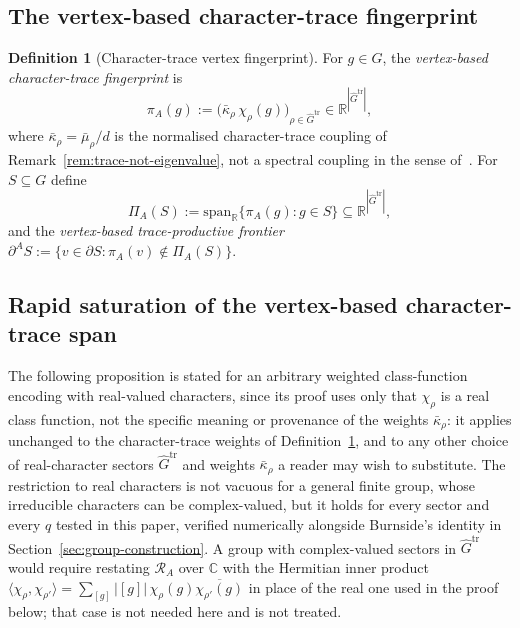 \documentclass[11pt,a4paper]{article}
\theoremstyle{plain}
\theoremstyle{definition}
\newtheorem{definition}[theorem]{Definition}
\theoremstyle{remark}
\newcommand{\R}{\mathbb{R}}
\newcommand{\C}{\mathbb{C}}
\newcommand{\adm}{\mathrm{tr}}
\newcommand{\Gadm}{\widehat{G}^{\adm}}
\newcommand{\PiA}{\Pi_A}
\newcommand{\dA}{\partial^A}
\newcommand{\kap}{\bar\kappa_\rho}
\newcommand{\mubar}{\bar\mu_\rho}
\newcommand{\piA}{\pi_A}
\begin{document}
    \subsection{The vertex-based character-trace fingerprint}
      \label{subsec:vertex-fingerprint}

      \begin{definition}[Character-trace vertex fingerprint]
        \label{def:vertex-fingerprint}
        For $g \in G$, the \emph{vertex-based character-trace fingerprint} is
        \[
          \piA(g) := \bigl(\kap \, \chi_\rho(g)\bigr)_{\rho \in \Gadm}
          \in \R^{|\Gadm|},
        \]
        where $\kap = \mubar / d$ is the normalised character-trace coupling of
        Remark~\ref{rem:trace-not-eigenvalue}, not a spectral coupling in the sense
        of~\cite{Beau2026a2}.
        For $S \subseteq G$ define
        \[
          \PiA(S) := \mathrm{span}_{\R}\{\piA(g) : g \in S\}
          \subseteq \R^{|\Gadm|},
        \]
        and the \emph{vertex-based trace-productive frontier}
        $\dA S := \{v \in \partial S : \piA(v) \notin \PiA(S)\}$.
      \end{definition}

    \subsection{Rapid saturation of the vertex-based character-trace span}
      \label{subsec:saturation}

      The following proposition is stated for an arbitrary weighted class-function encoding with
      real-valued characters, since its proof uses only that $\chi_\rho$ is a real class function,
      not the specific meaning or provenance of the weights $\kap$: it applies unchanged to the
      character-trace weights of Definition~\ref{def:vertex-fingerprint}, and to any other choice of
      real-character sectors $\Gadm$ and weights $\kap$ a reader may wish to substitute.
      The restriction to real characters is not vacuous for a general finite group, whose
      irreducible characters can be complex-valued, but it holds for every sector and every $q$
      tested in this paper, verified numerically alongside Burnside's identity in
      Section~\ref{sec:group-construction}.
      A group with complex-valued sectors in $\Gadm$ would require restating $\mathcal R_A$ over
      $\C$ with the Hermitian inner product $\langle \chi_\rho,\chi_{\rho'}\rangle = \sum_{[g]}
      |[g]|\,\chi_\rho(g)\overline{\chi_{\rho'}(g)}$ in place of the real one used in the proof below;
      that case is not needed here and is not treated.
\end{document}
